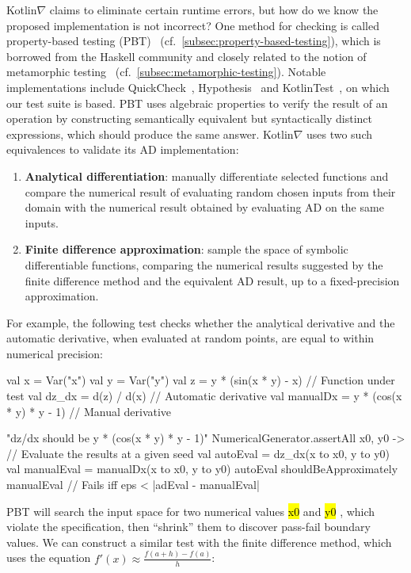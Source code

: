 \documentclass[12pt,initial,twoside,maitrise]{dms}
\newcommand{\inline}[1]{%
\begingroup%
\sethlcolor{slightgray}%
\hl{\ttfamily\small #1}%
\endgroup
}
\numberwithin{equation}{section}
\numberwithin{table}{chapter}
\numberwithin{figure}{chapter}
\begin{document}
Kotlin$\nabla$ claims to eliminate certain runtime errors, but how do we know the proposed implementation is not incorrect? One method for checking is called property-based testing (PBT)~\citep{fink1997property} (cf.~\autoref{subsec:property-based-testing}), which is borrowed from the Haskell community and closely related to the notion of metamorphic testing~\citep{chen1998metamorphic} (cf.~\autoref{subsec:metamorphic-testing}). Notable implementations include QuickCheck~\citep{claessen2011quickcheck}, Hypothesis~\citep{Hypothesis} and KotlinTest~\citep{kotlintest}, on which our test suite is based. PBT uses algebraic properties to verify the result of an operation by constructing semantically equivalent but syntactically distinct expressions, which should produce the same answer. Kotlin$\nabla$ uses two such equivalences to validate its AD implementation: \\
%
\begin{enumerate}
    \item \textbf{Analytical differentiation}: manually differentiate selected functions and compare the numerical result of evaluating random chosen inputs from their domain with the numerical result obtained by evaluating AD on the same inputs.
    \item \textbf{Finite difference approximation}: sample the space of symbolic differentiable functions, comparing the numerical results suggested by the finite difference method and the equivalent AD result, up to a fixed-precision approximation. \\
\end{enumerate}
%
For example, the following test checks whether the analytical derivative and the automatic derivative, when evaluated at random points, are equal to within numerical precision:
%
\begin{kotlinlisting}
val x = Var("x")
val y = Var("y")
val z = y * (sin(x * y) - x)            // Function under test
val dz_dx = d(z) / d(x)                 // Automatic derivative
val manualDx = y * (cos(x * y) * y - 1) // Manual derivative

"dz/dx should be y * (cos(x * y) * y - 1)" {
    NumericalGenerator.assertAll { x0, y0 ->
        // Evaluate the results at a given seed
        val autoEval = dz_dx(x to x0, y to y0)
        val manualEval = manualDx(x to x0, y to y0)
        autoEval shouldBeApproximately manualEval // Fails iff eps < |adEval - manualEval|
    }
}
\end{kotlinlisting}
%
PBT will search the input space for two numerical values \inline{x0} and \inline{y0}, which violate the specification, then ``shrink'' them to discover pass-fail boundary values. We can construct a similar test with the finite difference method, which uses the equation $f'(x) \approx \frac{f(a+h)-f(a)}{h}$:
\end{document}
